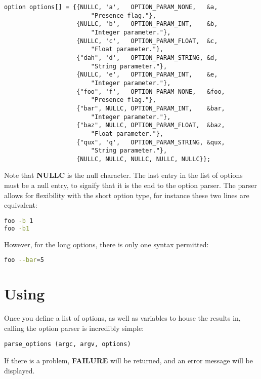 \documentclass[12pt,a4paper]{article}
\begin{document}
\begin{lstlisting}
option options[] = {{NULLC, 'a',   OPTION_PARAM_NONE,   &a,
                        "Presence flag."},
                    {NULLC, 'b',   OPTION_PARAM_INT,    &b,
                        "Integer parameter."},
                    {NULLC, 'c',   OPTION_PARAM_FLOAT,  &c,
                        "Float parameter."},
                    {"dah", 'd',   OPTION_PARAM_STRING, &d,
                        "String parameter."},
                    {NULLC, 'e',   OPTION_PARAM_INT,    &e,
                        "Integer parameter."},
                    {"foo", 'f',   OPTION_PARAM_NONE,   &foo,
                        "Presence flag."},
                    {"bar", NULLC, OPTION_PARAM_INT,    &bar,
                        "Integer parameter."},
                    {"baz", NULLC, OPTION_PARAM_FLOAT,  &baz,
                        "Float parameter."},
                    {"qux", 'q',   OPTION_PARAM_STRING, &qux,
                        "String parameter."},
                    {NULLC, NULLC, NULLC, NULLC, NULLC}};
\end{lstlisting}

Note that \textbf{NULLC} is the null character. The last entry in the list of options must be a null entry, to signify that it is the end to the option parser. The parser allows for flexibility with the short option type, for instance these two lines are equivalent:

\begin{lstlisting}[language=bash]
foo -b 1
foo -b1
\end{lstlisting}

However, for the long options, there is only one syntax permitted:

\begin{lstlisting}[language=bash]
foo --bar=5
\end{lstlisting}

\section{Using}

Once you define a list of options, as well as variables to house the results in, calling the option parser is incredibly simple:

\begin{lstlisting}
parse_options (argc, argv, options)
\end{lstlisting}

If there is a problem, \textbf{FAILURE} will be returned, and an error message will be displayed.
\end{document}
